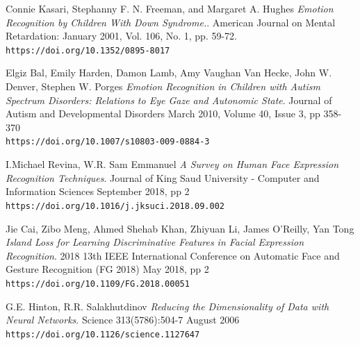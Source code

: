 \documentclass[runningheads,a4paper,11pt]{report}
\begin{document}
\begin{thebibliography}{1}
Connie Kasari, Stephanny F. N. Freeman, and Margaret A. Hughes
\textit{Emotion Recognition by Children With Down Syndrome.}.
American Journal on Mental Retardation: January 2001, Vol. 106, No. 1, pp. 59-72.
\\\texttt{https://doi.org/10.1352/0895-8017}

Elgiz Bal, Emily Harden, Damon Lamb, Amy Vaughan Van Hecke, John W. Denver, Stephen W. Porges
\textit{Emotion Recognition in Children with Autism Spectrum Disorders: Relations to Eye Gaze and Autonomic State}.
Journal of Autism and Developmental Disorders
March 2010, Volume 40, Issue 3, pp 358-370
\\\texttt{https://doi.org/10.1007/s10803-009-0884-3}

I.Michael Revina, W.R. Sam Emmanuel
\textit{A Survey on Human Face Expression Recognition Techniques}.
Journal of King Saud University - Computer and Information Sciences
September 2018, pp 2
\\\texttt{https://doi.org/10.1016/j.jksuci.2018.09.002}

Jie Cai, Zibo Meng, Ahmed Shehab Khan, Zhiyuan Li, James O'Reilly, Yan Tong
\textit{Island Loss for Learning Discriminative Features in Facial Expression Recognition}.
 2018 13th IEEE International Conference on Automatic Face and Gesture Recognition (FG 2018)
May 2018, pp 2
\\\texttt{https://doi.org/10.1109/FG.2018.00051}

G.E. Hinton, R.R. Salakhutdinov
\textit{Reducing the Dimensionality of Data with Neural Networks}.
Science 313(5786):504-7
August 2006
\\\texttt{https://doi.org/10.1126/science.1127647}

\end{thebibliography}
\end{document}
